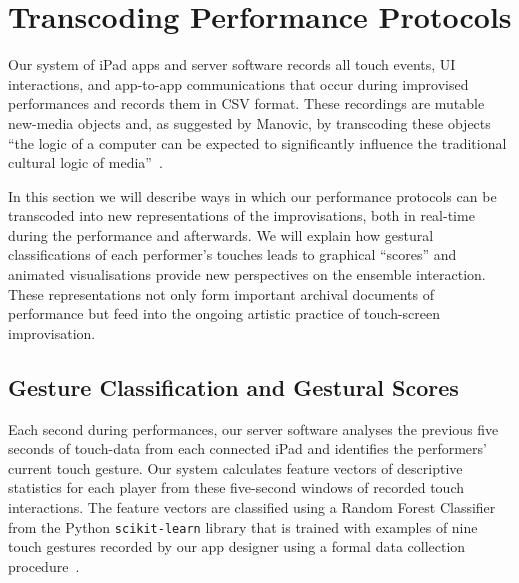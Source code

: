\documentclass[graybox]{svmult}
\begin{document}
\section{Transcoding Performance Protocols}
\label{sec:analysis}

Our system of iPad apps and server software records all touch events,
UI interactions, and app-to-app communications that occur during
improvised performances and records them in CSV format. These
recordings are mutable new-media objects and, as suggested by Manovic,
by transcoding these objects ``the logic of a computer can be expected
to significantly influence the traditional cultural logic of
media''~\cite{Manovich:2002ly}.

In this section we will describe ways in which our performance
protocols can be transcoded into new representations of the
improvisations, both in real-time during the performance and
afterwards. We will explain how gestural classifications of each
performer's touches leads to graphical ``scores'' and animated
visualisations provide new perspectives on the ensemble interaction.
These representations not only form important archival documents of
performance but feed into the ongoing artistic practice of
touch-screen improvisation.


\subsection{Gesture Classification and Gestural Scores}
\label{subsec:gesture-classification}

Each second during performances, our server software analyses the
previous five seconds of touch-data from each connected iPad and
identifies the performers' current touch gesture. Our system
calculates feature vectors of descriptive statistics for each player
from these five-second windows of recorded touch interactions. The
feature vectors are classified using a Random Forest
Classifier~\cite{Breiman:2001kx} from the Python \texttt{scikit-learn}
library that is trained with examples of nine touch gestures recorded
by our app designer using a formal data collection
procedure~\cite{Martin:2015jk}. 
\end{document}
